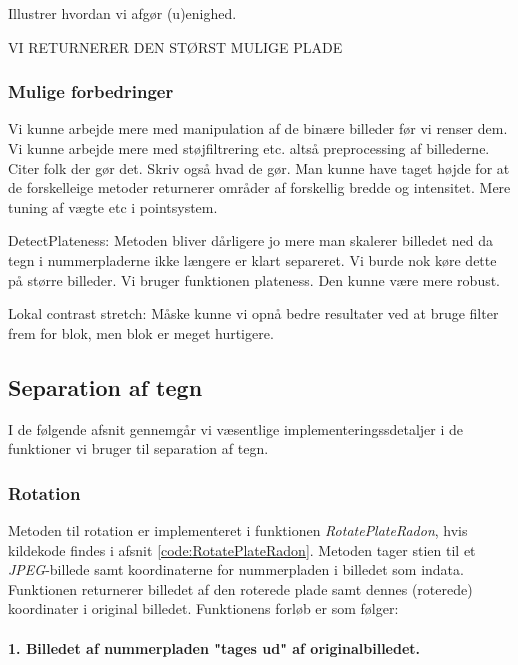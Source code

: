 Illustrer hvordan vi afgør (u)enighed. 

VI RETURNERER DEN STØRST MULIGE PLADE

\subsubsection{Mulige forbedringer}
Vi kunne arbejde mere med manipulation af de binære billeder før vi renser dem. Vi kunne arbejde mere med støjfiltrering etc. altså preprocessing af billederne. Citer folk der gør det. Skriv også hvad de gør.
Man kunne have taget højde for at de forskelleige metoder returnerer områder af forskellig bredde og intensitet.
Mere tuning af vægte etc i pointsystem.

DetectPlateness:
Metoden bliver dårligere jo mere man skalerer billedet ned da tegn i nummerpladerne ikke længere er klart separeret. Vi burde nok køre dette på større billeder.
Vi bruger funktionen plateness. Den kunne være mere robust.

Lokal contrast stretch:
Måske kunne vi opnå bedre resultater ved at bruge filter frem for blok, men blok er meget hurtigere.



\subsection{Separation af tegn}

I de følgende afsnit gennemgår vi væsentlige implementeringssdetaljer i de funktioner vi bruger til separation af tegn. 

\subsubsection{Rotation}
\label{sec:implementation/sep/rotation}

Metoden til rotation er implementeret i funktionen \textit{RotatePlateRadon}, hvis kildekode findes i afsnit \vref{code:RotatePlateRadon}. Metoden tager stien til et \textit{JPEG}-billede samt koordinaterne for nummerpladen i billedet som indata. Funktionen returnerer billedet af den roterede plade samt dennes (roterede) koordinater i original billedet. Funktionens forløb er som følger:

\paragraph{1. Billedet af nummerpladen "tages ud" af originalbilledet.}

